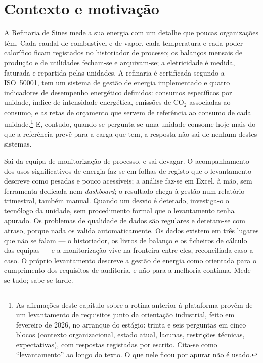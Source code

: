 \section{Contexto e motivação}
\label{sec:contexto}

A Refinaria de Sines mede a sua energia com um detalhe que poucas
organizações têm. Cada caudal de combustível e de vapor, cada temperatura
e cada poder calorífico ficam registados no historiador de processo; os balanços mensais de produção e de utilidades fecham-se e
arquivam-se; a eletricidade é medida, faturada e repartida pelas
unidades. A refinaria é certificada segundo a ISO~50001, tem um sistema
de gestão de energia implementado e quatro indicadores de desempenho
energético definidos: consumos específicos por unidade, índice de
intensidade energética, emissões de CO$_2$ associadas ao consumo, e as
retas de orçamento que servem de referência ao consumo de cada
unidade.\footnote{As afirmações deste capítulo sobre a rotina anterior à
plataforma provêm de um levantamento de requisitos junto da orientação
industrial, feito em fevereiro de 2026, no arranque do estágio: trinta e
seis perguntas em cinco blocos (contexto organizacional, estado atual,
lacunas, restrições técnicas, expectativas), com respostas registadas por
escrito. Cita-se como \enquote{levantamento} ao longo do texto. O que
nele ficou por apurar não é usado.} E, contudo, quando se pergunta se uma
unidade consome hoje mais do que a referência prevê para a carga que tem,
a resposta não sai de nenhum destes sistemas.

Sai da equipa de monitorização de processo, e sai devagar. O
acompanhamento dos usos significativos de energia faz-se em folhas de
registo que o levantamento descreve como pesadas e pouco acessíveis; a
análise faz-se em Excel, à mão, sem ferramenta dedicada nem
\emph{dashboard}; o resultado chega à gestão num relatório trimestral,
também manual. Quando um desvio é detetado, investiga-o o tecnólogo da
unidade, sem procedimento formal que o levantamento tenha apurado. Os
problemas de qualidade de dados são regulares e detetam-se com atraso,
porque nada os valida automaticamente. Os dados existem em três lugares
que não se falam --- o historiador, os livros de balanço e os ficheiros
de cálculo das equipas --- e a monitorização vive na fronteira entre
eles, reconciliada caso a caso. O próprio levantamento descreve a gestão
de energia como orientada para o cumprimento dos requisitos de auditoria,
e não para a melhoria contínua. Mede-se tudo; sabe-se tarde.

